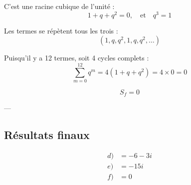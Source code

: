\documentclass[a4paper,12pt]{article}
\begin{document}
C’est une racine cubique de l’unité :
\[
1 + q + q^2 = 0, \quad \text{et} \quad q^3 = 1
\]

Les termes se répètent tous les trois :
\[
(1, q, q^2, 1, q, q^2, \dots)
\]

Puisqu’il y a 12 termes, soit 4 cycles complets :
\[
\sum_{m=0}^{12} q^m = 4(1 + q + q^2) = 4 \times 0 = 0
\]

\[
\boxed{S_f = 0}
\]

---

\subsection*{Résultats finaux}

\[
\boxed{
\begin{aligned}
d) & = -6 - 3i \\
e) & = -15i \\
f) & = 0
\end{aligned}
}
\]
\end{document}
